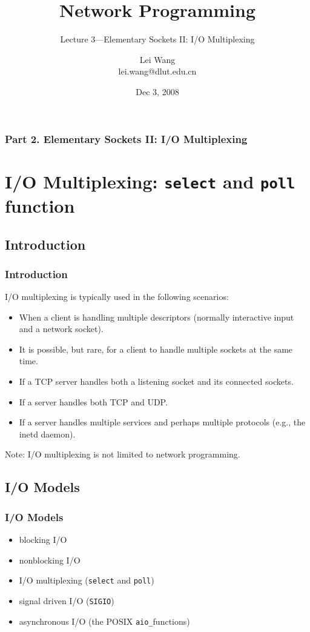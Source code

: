 \documentclass[notes,serif]{beamer}
\title{Network Programming}
\subtitle{Lecture 3---Elementary Sockets II: I/O Multiplexing}
\author{Lei Wang\\ lei.wang@dlut.edu.cn}
\institute{Dalian University of Technology}
\date{Dec 3, 2008}
\begin{document}
\begin{frame}
  \titlepage
\end{frame}

\begin{frame}
  \frametitle{Part 2. Elementary Sockets II: I/O Multiplexing}
  \tableofcontents
\end{frame}

\section{I/O Multiplexing: {\tt select} and {\tt poll} function}
\subsection{Introduction}

\begin{frame}
\frametitle{Introduction}

I/O multiplexing is typically used in the following scenarios:
\begin{itemize}
  \item When a client is handling multiple descriptors (normally interactive input and a network socket).
  \item It is possible, but rare, for a client to handle multiple sockets at the same time.
  \item If a TCP server handles both a listening socket and its connected sockets.
  \item If a server handles both TCP and UDP.
  \item If a server handles multiple services and perhaps multiple protocols (e.g., the inetd daemon).
\end{itemize}
Note: I/O multiplexing is not limited to network programming.
\end{frame}

\subsection{I/O Models}
\begin{frame}
\frametitle{I/O Models}
\begin{itemize}
  \item blocking I/O
  \item nonblocking I/O
  \item I/O multiplexing (\texttt{select} and \texttt{poll})
  \item signal driven I/O (\texttt{SIGIO})
  \item asynchronous I/O (the POSIX \texttt{aio\_}functions)
\end{itemize}
\end{frame}
\end{document}
